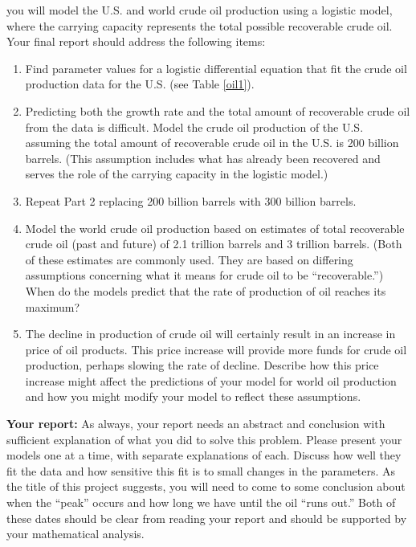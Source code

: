 \documentclass
[justified,nohyper]
{tufte-handout}
\begin{document}
 you will model the U.S. and world crude oil production using a logistic model, where the carrying capacity represents the total possible recoverable crude oil. Your final report should address the following items:

\begin{enumerate}
  \item Find parameter values for a logistic differential equation that fit the crude oil production data for the U.S. (see Table \ref{oil1}).
  \item Predicting both the growth rate and the total amount of recoverable crude oil from the data is difficult. Model the crude oil production of the U.S. assuming the total amount of recoverable crude oil in the U.S. is 200 billion barrels. (This assumption includes what has already been recovered and serves the role of the carrying capacity in the logistic model.)
  \item Repeat Part 2 replacing 200 billion barrels with 300 billion barrels.
  \item Model the world crude oil production based on estimates of total recoverable crude oil (past and future) of 2.1 trillion barrels and 3 trillion barrels. (Both of these estimates are commonly used. They are based on differing assumptions concerning what it means for crude oil to be ``recoverable.'') When do the models predict that the rate of production of oil reaches its maximum?
  \item The decline in production of crude oil will certainly result in an increase in price of oil products. This price increase will provide more funds for crude oil production, perhaps slowing the rate of decline. Describe how this price increase might affect the predictions of your model for world oil production and how you might modify your model to reflect these assumptions.
\end{enumerate}

\textbf{Your report:} As always, your report needs an abstract and conclusion with sufficient explanation of what you did to solve this problem. Please present your models one at a time, with separate explanations of each. Discuss how well they fit the data and how sensitive this fit is to small changes in the parameters. As the title of this project suggests, you will need to come to some conclusion about when the ``peak'' occurs and how long we have until the oil ``runs out.'' Both of these dates should be clear from reading your report and should be supported by your mathematical analysis. 
\end{document}
